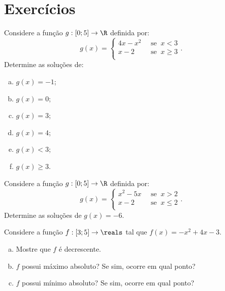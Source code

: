 \section{Exercícios}

\begin{exercise}
  Considere a função $g: [0 ; 5] \to \R$ definida por: $$g(x) =
                                \begin{cases}
                                4x-x^2 & \ \text{ se } \ x< 3 \\
                                x-2 & \ \text{ se } \  x \geq 3 \\
                                \end{cases}.$$
Determine as soluções de:
\begin{enumerate}[(a)]
  \item $g(x) = -1$;
  \item $g(x) = 0$;
  \item $g(x) = 3$;
  \item $g(x) = 4$;
  \item $g(x) < 3$;
  \item $g(x) \geq 3$.
\end{enumerate}
\end{exercise}

\begin{exercise}
  Considere a função $g: [0 ; 5] \to \R$ definida por: $$g(x) =
                                \begin{cases}
                                x^2-5x & \ \text{ se } \ x> 2 \\
                                x-2 & \ \text{ se } \  x \leq 2 \\
                                \end{cases}.$$
Determine as soluções de $g(x) = -6$.
\end{exercise}

\begin{exercise}
  Considere a função $f:[3;5]\to\reals$ tal que $f(x)=-x^2+4x-3$.
  \begin{enumerate}[(a)]
    \item Mostre que $f$ é decrescente.
    \item $f$ possui máximo absoluto? Se sim, ocorre em qual ponto?
    \item $f$ possui mínimo absoluto? Se sim, ocorre em qual ponto?
  \end{enumerate}
\end{exercise}


